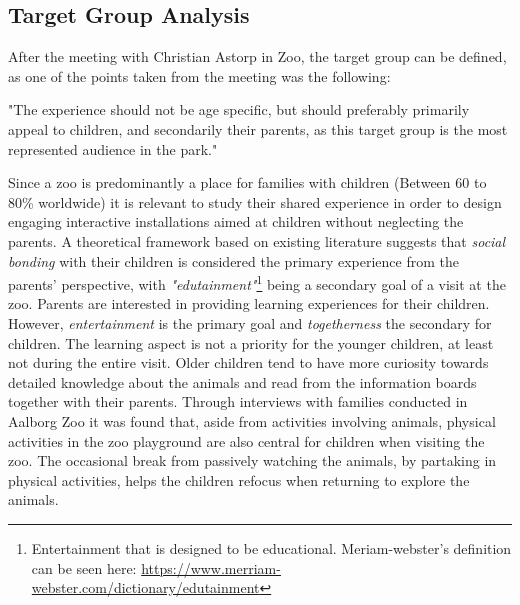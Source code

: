 



\subsection{Target Group Analysis}
After the meeting with Christian Astorp in Zoo, the target group can be defined, as one of the points taken from the meeting was the following:

"The experience should not be age specific, but should preferably primarily appeal to children, and secondarily their parents, as this target group is the most represented audience in the park."

Since a zoo is predominantly a place for families with children (Between 60 to 80\% worldwide)\cite{togetherAtTheZoo} it is relevant to study their shared experience in order to design engaging interactive installations aimed at children without neglecting the parents.
A theoretical framework based on existing literature suggests that \textit{social bonding} with their children is considered the primary experience from the parents' perspective, with \textit{"edutainment"}\footnote{Entertainment that is designed to be educational. Meriam-webster's definition can be seen here: \url{https://www.merriam-webster.com/dictionary/edutainment}} being a secondary goal of a visit at the zoo. Parents are interested in providing learning experiences for their children. However, \textit{entertainment} is the primary goal and \textit{togetherness} the secondary for children\cite{togetherAtTheZoo}. The learning aspect is not a priority for the younger children, at least not during the entire visit. Older children tend to have more curiosity towards detailed knowledge about the animals and read from the information boards together with their parents\cite{togetherAtTheZoo}. Through interviews with families conducted in Aalborg Zoo it was found that, aside from activities involving animals, physical activities in the zoo playground are also central for children when visiting the zoo. The occasional break from passively watching the animals, by partaking in physical activities, helps the children refocus when returning to explore the animals\cite{togetherAtTheZoo}.

